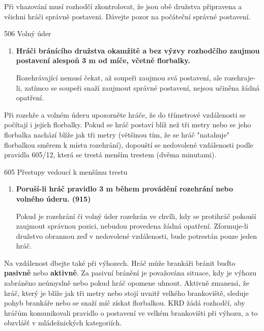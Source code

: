 \documentclass{newsletter}
\begin{document}
Při vhazování musí rozhodčí zkontrolovat, že jsou obě družstva připravena a všichni hráči správně postaveni. Dávejte pozor na počáteční správné postavení.

\begin{admonition-quote}{506 Volný úder}
	\begin{enumerate}\addtocounter{enumi}{2}
		\item \textbf{Hráči bránícího družstva okamžitě a bez výzvy rozhodčího zaujmou postavení alespoň 3 m od míče, včetně florbalky.}
		
		\begin{flushleft}
			Rozehrávající nemusí čekat, až soupeři zaujmou svá postavení, ale rozehraje-li, zatímco se soupeři snaží zaujmout správné postavení, nejsou učiněna žádná opatření.
		\end{flushleft}
	\end{enumerate}
\end{admonition-quote}

Při rozehře a volném úderu upozorněte hráče, že do třímetrové vzdálenosti se počítají i jejich florbalky. Pokud se hráč postaví blíž než tři metry nebo se jeho florbalka nachází blíže jak tři metry (většinou tím, že se hráč "natahuje" florbalkou směrem k místu rozehrání), dopouští se nedovolené vzdálenosti podle pravidla 605/12, která se trestá menším trestem (dvěma minutami).

\begin{admonition-quote}{605 Přestupy vedoucí k menšímu trestu}
	\begin{enumerate}\addtocounter{enumi}{11}
		\item \textbf{Poruší-li hráč pravidlo 3 m během provádění rozehrání nebo volného úderu. (915)}
		
		\begin{flushleft}
			Pokud je rozehrání či volný úder rozehrán ve chvíli, kdy se protihráč pokouší zaujmout správnou pozici, nebudou provedena žádná opatření. Zformuje-li družstvo obrannou zeď v nedovolené vzdálenosti, bude potrestán pouze jeden hráč.
		\end{flushleft}
	\end{enumerate}
\end{admonition-quote}

Na vzdálenost dbejte také při výhozech. Hráč může brankáři bránit buďto \textbf{pasivně} nebo \textbf{aktivně}. Za pasivní bránění je považována situace, kdy je výhozu zabráněno neúmyslně nebo pokud hráč opomene uhnout.
Aktivně zmanená, že hráč, který je blíže jak tři metry nebo stojí uvnitř velkého brankoviště, sleduje pohyb brankáře nebo se snaží míč získat florbalkou. KRD žádá rozhodčí, aby hráčům komunikovali pravidlo o postavení ve velkém brankovišti při výhozu, a to obzvlášť v mládežnických kategoriích.
\end{document}
